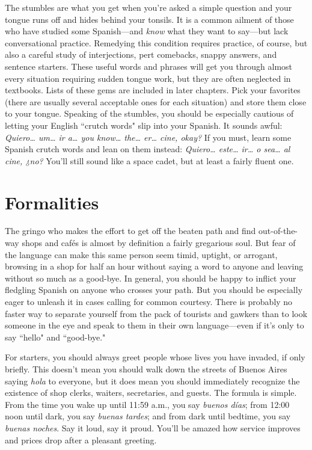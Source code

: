 The stumbles are what you get when you're asked a simple
question and your tongue runs off and hides behind your tonsils. It is a
common ailment of those who have studied some Spanish---and \emph{know}
what they want to say---but lack conversational practice. Remedying
this condition requires practice, of course, but also a careful study of
interjections, pert comebacks, snappy answers, and sentence starters.
These useful words and phrases will get you through almost every
situation requiring sudden tongue work, but they are often neglected
in textbooks. Lists of these gems are included in later chapters. Pick
your favorites (there are usually several acceptable ones for each situation) and store them close to your tongue.
Speaking of the stumbles, you should be especially cautious of
letting your English ``crutch words" slip into your Spanish. It sounds
awful: \emph{Quiero\ldots{} um\ldots{} ir a\ldots{} you know\ldots{} the\ldots{} er\ldots{} cine,
okay?} If you must, learn some Spanish crutch words and lean on them
instead: \emph{Quiero\ldots{} este\ldots{} ir\ldots{} o sea\ldots{} al cine, ¿no?} You'll still
sound like a space cadet, but at least a fairly fluent one.

\section{Formalities}

The gringo who makes the effort to get off the beaten path and
find out-of-the-way shops and cafés is almost by definition a fairly gregarious soul. But fear of the language can make this same person seem
timid, uptight, or arrogant, browsing in a shop for half an hour without
saying a word to anyone and leaving without so much as a good-bye. In
general, you should be happy to inflict your fledgling Spanish on anyone who crosses your path. But you should be especially eager to unleash it in cases calling for common courtesy. There is probably no
faster way to separate yourself from the pack of tourists and gawkers
than to look someone in the eye and speak to them in their own language---even if it's only to say ``hello" and ``good-bye."

For starters, you should always greet people whose lives you
have invaded, if only briefly. This doesn't mean you should walk down
the streets of Buenos Aires saying \emph{hola} to everyone, but it does mean
you should immediately recognize the existence of shop clerks, waiters, secretaries, and guests. The formula is simple. From the time you
wake up until 11:59 a.m., you say \emph{buenos días}; from 12:00 noon until
dark, you say \emph{buenas tardes}; and from dark until bedtime, you say
\emph{buenas noches}. Say it loud, say it proud. You'll be amazed how service
improves and prices drop after a pleasant greeting.

